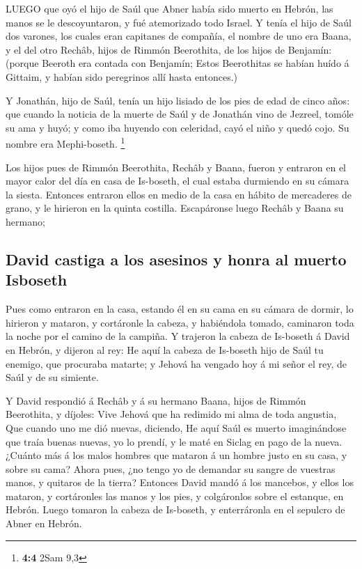  LUEGO que oyó el hijo de Saúl que Abner había sido muerto
en Hebrón, las manos se le descoyuntaron, y fué atemorizado todo Israel.
 Y tenía el hijo de Saúl dos varones, los cuales eran
capitanes de compañía, el nombre de uno era Baana, y el del otro Rechâb,
hijos de Rimmón Beerothita, de los hijos de Benjamín: (porque Beeroth
era contada con Benjamín;  Estos Beerothitas se habían huído
á Gittaim, y habían sido peregrinos allí hasta entonces.)

 Y Jonathán, hijo de Saúl, tenía un hijo lisiado de los pies
de edad de cinco años: que cuando la noticia de la muerte de Saúl y de
Jonathán vino de Jezreel, tomóle su ama y huyó; y como iba huyendo con
celeridad, cayó el niño y quedó cojo. Su nombre era Mephi-boseth.
\footnote{\textbf{4:4} 2Sam 9,3}

 Los hijos pues de Rimmón Beerothita, Rechâb y Baana, fueron
y entraron en el mayor calor del día en casa de Is-boseth, el cual
estaba durmiendo en su cámara la siesta.  Entonces entraron
ellos en medio de la casa en hábito de mercaderes de grano, y le
hirieron en la quinta costilla. Escapáronse luego Rechâb y Baana su
hermano;

\hypertarget{david-castiga-a-los-asesinos-y-honra-al-muerto-isboseth}{%
\subsection{David castiga a los asesinos y honra al muerto
Isboseth}\label{david-castiga-a-los-asesinos-y-honra-al-muerto-isboseth}}

 Pues como entraron en la casa, estando él en su cama en su
cámara de dormir, lo hirieron y mataron, y cortáronle la cabeza, y
habiéndola tomado, caminaron toda la noche por el camino de la campiña.
 Y trajeron la cabeza de Is-boseth á David en Hebrón, y
dijeron al rey: He aquí la cabeza de Is-boseth hijo de Saúl tu enemigo,
que procuraba matarte; y Jehová ha vengado hoy á mi señor el rey, de
Saúl y de su simiente.

 Y David respondió á Rechâb y á su hermano Baana, hijos de
Rimmón Beerothita, y díjoles: Vive Jehová que ha redimido mi alma de
toda angustia,  Que cuando uno me dió nuevas, diciendo, He
aquí Saúl es muerto imaginándose que traía buenas nuevas, yo lo prendí,
y le maté en Siclag en pago de la nueva.  ¿Cuánto más á los
malos hombres que mataron á un hombre justo en su casa, y sobre su cama?
Ahora pues, ¿no tengo yo de demandar su sangre de vuestras manos, y
quitaros de la tierra?  Entonces David mandó á los
mancebos, y ellos los mataron, y cortáronles las manos y los pies, y
colgáronlos sobre el estanque, en Hebrón. Luego tomaron la cabeza de
Is-boseth, y enterráronla en el sepulcro de Abner en Hebrón.

